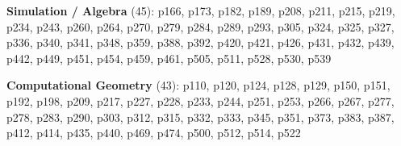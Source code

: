 \noindent\textbf{Simulation / Algebra} (45): p166, p173, p182, p189, p208, p211, p215, p219, p234, p243, p260, p264, p270, p279, p284, p289, p293, p305, p324, p325, p327, p336, p340, p341, p348, p359, p388, p392, p420, p421, p426, p431, p432, p439, p442, p449, p451, p454, p459, p461, p505, p511, p528, p530, p539\par\smallskip
\noindent\textbf{Computational Geometry} (43): p110, p120, p124, p128, p129, p150, p151, p192, p198, p209, p217, p227, p228, p233, p244, p251, p253, p266, p267, p277, p278, p283, p290, p303, p312, p315, p332, p333, p345, p351, p373, p383, p387, p412, p414, p435, p440, p469, p474, p500, p512, p514, p522\par\smallskip
